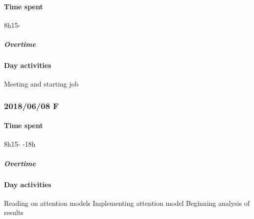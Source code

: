 \paragraph{Time spent}
{8h15}-

\subparagraph{Overtime}


\paragraph{Day activities}
Meeting and starting job

\subsubsection{2018/06/08 F}
\paragraph{Time spent}
{8h15}-
-{18h}

\subparagraph{Overtime}


\paragraph{Day activities}
Reading on attention models
Implementing attention model
Beginning analysis of results